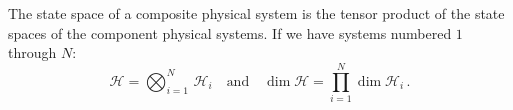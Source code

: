\begin{postulate}\label{postulate:4}
The state space of a composite physical system is the tensor product
of the state spaces of the component physical systems. If we have systems numbered $1$ through $N$:
\begin{equation*}
   \mathcal{H} = \bigotimes_{i=1}^{N}\,\mathcal{H}_i \quad  \text{and} \quad \dim\mathcal{H} = \prod_{i=1}^N \dim\mathcal{H}_i\,.
\end{equation*}
\end{postulate}